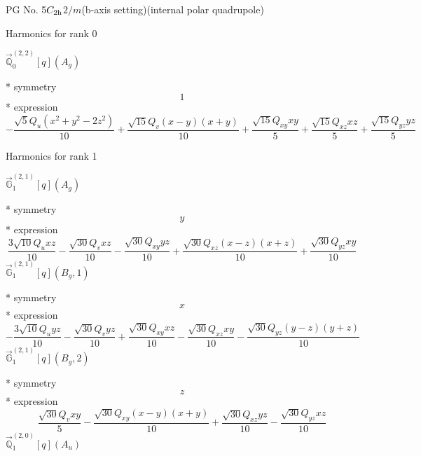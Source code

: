 \documentclass[fleqn,8pt]{jsarticle}
\begin{document}
\setcounter{MaxMatrixCols}{32}

\renewcommand{\tablename}{Table~}
\renewcommand{\figurename}{Figure~}
\begin{center}
\LARGE
PG No. 5\quad$C_{\rm 2h}$\quad$2/m$\quad(b-axis setting)\quad[ monoclinic ] (internal polar quadrupole)
\end{center}

\noindent * Harmonics for rank 0

\noindent\quad $\vec{\mathbb{Q}}_{0}^{(2,2)}[q](A_{g})$

\noindent\quad ** symmetry
\begin{dmath*}
1
\end{dmath*}
\noindent\quad ** expression
\begin{dmath*}
- \frac{\sqrt{5} Q_{u} \left(x^{2} + y^{2} - 2 z^{2}\right)}{10} + \frac{\sqrt{15} Q_{v} \left(x - y\right) \left(x + y\right)}{10} + \frac{\sqrt{15} Q_{xy} x y}{5} + \frac{\sqrt{15} Q_{xz} x z}{5} + \frac{\sqrt{15} Q_{yz} y z}{5}
\end{dmath*}

\noindent * Harmonics for rank 1

\noindent\quad $\vec{\mathbb{G}}_{1}^{(2,1)}[q](A_{g})$

\noindent\quad ** symmetry
\begin{dmath*}
y
\end{dmath*}
\noindent\quad ** expression
\begin{dmath*}
\frac{3 \sqrt{10} Q_{u} x z}{10} - \frac{\sqrt{30} Q_{v} x z}{10} - \frac{\sqrt{30} Q_{xy} y z}{10} + \frac{\sqrt{30} Q_{xz} \left(x - z\right) \left(x + z\right)}{10} + \frac{\sqrt{30} Q_{yz} x y}{10}
\end{dmath*}
\noindent\quad $\vec{\mathbb{G}}_{1}^{(2,1)}[q](B_{g},1)$

\noindent\quad ** symmetry
\begin{dmath*}
x
\end{dmath*}
\noindent\quad ** expression
\begin{dmath*}
- \frac{3 \sqrt{10} Q_{u} y z}{10} - \frac{\sqrt{30} Q_{v} y z}{10} + \frac{\sqrt{30} Q_{xy} x z}{10} - \frac{\sqrt{30} Q_{xz} x y}{10} - \frac{\sqrt{30} Q_{yz} \left(y - z\right) \left(y + z\right)}{10}
\end{dmath*}
\noindent\quad $\vec{\mathbb{G}}_{1}^{(2,1)}[q](B_{g},2)$

\noindent\quad ** symmetry
\begin{dmath*}
z
\end{dmath*}
\noindent\quad ** expression
\begin{dmath*}
\frac{\sqrt{30} Q_{v} x y}{5} - \frac{\sqrt{30} Q_{xy} \left(x - y\right) \left(x + y\right)}{10} + \frac{\sqrt{30} Q_{xz} y z}{10} - \frac{\sqrt{30} Q_{yz} x z}{10}
\end{dmath*}
\noindent\quad $\vec{\mathbb{Q}}_{1}^{(2,0)}[q](A_{u})$
\end{document}
